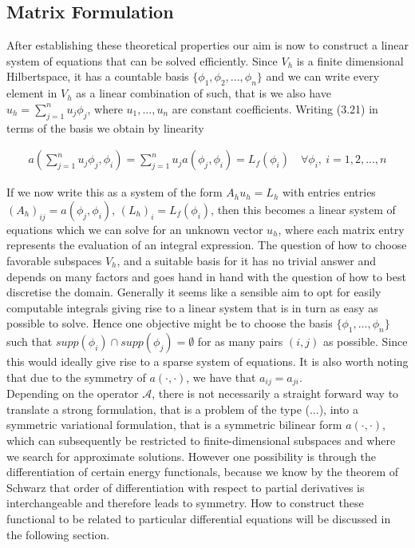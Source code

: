 \documentclass[../draft_1.tex]{subfiles}
\begin{document}
\subsection{Matrix Formulation}
After establishing these theoretical properties our aim is now to construct a linear system of equations that can be solved efficiently. Since $V_h$ is a finite dimensional Hilbertspace, it has a countable basis $\{\phi_1, \phi_2, ..., \phi_n \}$ and we can write every element in $V_h$ as a linear combination of such, that is we also have $u_h = \sum_{j=1}^{n} u_j \phi_j$, where $u_1, ..., u_n$ are constant coefficients. Writing (3.21) in terms of the basis we obtain by linearity
\begin{ceqn}
\begin{equation}
\begin{aligned}
a(\sum_{j=1}^{n} u_j \phi_j, \phi_i) = \sum_{j=1}^{n} u_j a(\phi_j, \phi_i) = L_f(\phi_i) \quad \forall \phi_i, \ i = 1, 2, ..., n 
\end{aligned}
\end{equation}
\end{ceqn}
If we now write this as a system of the form $A_h u_h = L_h$ with entries entries $(A_h)_{ij} = a(\phi_j, \phi_i)$, $(L_h)_i = L_f(\phi_i)$, then this becomes a linear system of equations which we can solve for an unknown vector $u_h$, where each matrix entry represents the evaluation of an integral expression. The question of how to choose favorable subspaces $V_h$, and a suitable basis for it has no trivial answer and depends on many factors and goes hand in hand with the question of how to best discretise the domain. Generally it seems like a sensible aim to opt for easily computable integrals giving rise to a linear system that is in turn as easy as possible to solve. Hence one objective might be to choose the basis $\{\phi_1, ..., \phi_n \}$ such that $supp(\phi_i) \cap supp(\phi_j) = \emptyset$ for as many pairs $(i,j)$ as possible. Since this would ideally give rise to a sparse system of equations. It is also worth noting that due to the symmetry of $a(\cdot, \cdot)$, we have that $a_{ij} = a_{ji}$.
\smallskip
\\
Depending on the operator $\mathcal{A}$, there is not necessarily a straight forward way to translate a strong formulation, that is a problem of the type (...), into a symmetric variational formulation, that is a symmetric bilinear form $a(\cdot, \cdot)$, which can subsequently be restricted to finite-dimensional subspaces and where we search for approximate solutions. However one possibility is through the differentiation of certain energy functionals, because we know by the theorem of Schwarz that order of differentiation with respect to partial derivatives is interchangeable and therefore leads to symmetry. How to construct these functional to be related to particular differential equations will be discussed in the following section.
\end{document}
